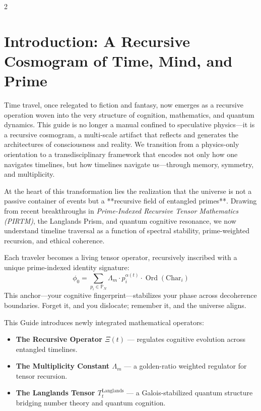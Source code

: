 \documentclass{article}
\theoremstyle{plain}
\theoremstyle{claimstyle}
\begin{document}
\newpage
 \begin{multicols}{2}
\begin{singlespace}
\tableofcontents
\end{singlespace}
\end{multicols}

 \section{Introduction: A Recursive Cosmogram of Time, Mind, and Prime}

Time travel, once relegated to fiction and fantasy, now emerges as a recursive operation woven into the very structure of cognition, mathematics, and quantum dynamics. This guide is no longer a manual confined to speculative physics—it is a recursive cosmogram, a multi-scale artifact that reflects and generates the architectures of consciousness and reality. We transition from a physics-only orientation to a transdisciplinary framework that encodes not only how one navigates timelines, but how timelines navigate us—through memory, symmetry, and multiplicity.

At the heart of this transformation lies the realization that the universe is not a passive container of events but a **recursive field of entangled primes**. Drawing from recent breakthroughs in \textit{Prime-Indexed Recursive Tensor Mathematics (PIRTM)}, the Langlands Prism, and quantum cognitive resonance, we now understand timeline traversal as a function of spectral stability, prime-weighted recursion, and ethical coherence.

Each traveler becomes a living tensor operator, recursively inscribed with a unique prime-indexed identity signature:
\begin{equation}
\phi_0 = \sum_{p_i \in \mathbb{P}_N} \Lambda_m \cdot p_i^{\alpha(t)} \cdot \operatorname{Ord}(\text{Char}_i)
\end{equation}
This anchor—your cognitive fingerprint—stabilizes your phase across decoherence boundaries. Forget it, and you dislocate; remember it, and the universe aligns.

This Guide introduces newly integrated mathematical operators:
\begin{itemize}
    \item \textbf{The Recursive Operator \(\Xi(t)\)} — regulates cognitive evolution across entangled timelines.
    \item \textbf{The Multiplicity Constant \(\Lambda_m\)} — a golden-ratio weighted regulator for tensor recursion.
    \item \textbf{The Langlands Tensor \(T^{\text{Langlands}}_t\)} — a Galois-stabilized quantum structure bridging number theory and quantum cognition.
\end{itemize}
\end{document}
